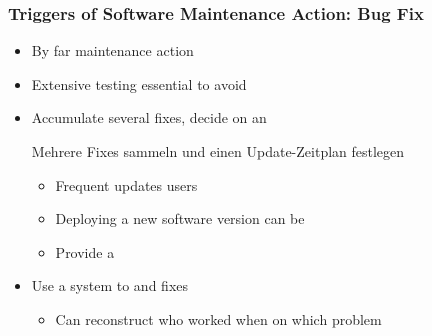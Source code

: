 \subsubsection*{Triggers of Software Maintenance Action: Bug Fix}
\begin{itemize}
    \item By far  maintenance action
\end{itemize}
\begin{itemize}
    \item Extensive testing essential to avoid 
    \item Accumulate several fixes, decide on an 
    \begin{infoBox}
        Mehrere Fixes sammeln und einen Update-Zeitplan festlegen
    \end{infoBox}
    \begin{itemize}
        \item Frequent updates  users
        \item Deploying a new software version can be 
        \item Provide a 
    \end{itemize}
    \item Use a  system to  and  fixes
    \begin{itemize}
        \item Can reconstruct who worked when on which problem
    \end{itemize}
\end{itemize}
